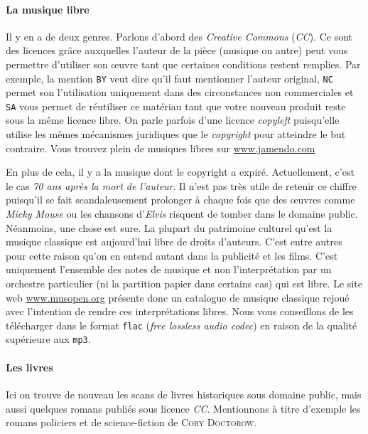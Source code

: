 \documentclass[10pt]{../fiche}
\begin{document}
\paragraph{La musique libre}
Il y en a de deux genres. Parlons d'abord des \textit{Creative Commons} (\textit{CC}). Ce sont des licences grâce auxquelles l'auteur de la pièce (musique ou autre) peut vous permettre
d'utiliser son \oe uvre tant que certaines conditions restent remplies. Par exemple, la mention \texttt{BY} veut dire qu'il faut mentionner l'auteur original, \texttt{NC} permet son l'utilisation
uniquement dans des circonstances non commerciales et \texttt{SA} vous permet de réutiliser ce matériau tant que votre nouveau produit reste sous la même licence libre.
On parle parfois d'une licence \textit{copyleft} puisqu'elle utilise les mêmes mécanismes juridiques que le \textit{copyright} pour atteindre le but contraire. Vous trouvez plein de musiques libres sur \url{www.jamendo.com}

En plus de cela, il y a la musique dont le copyright a expiré. Actuellement, c'est le cas \textit{70 ans après la mort de l'auteur}.
Il n'est pas très utile de retenir ce chiffre puisqu'il se fait scandaleusement prolonger à chaque fois que des \oe uvres comme \textit{Micky Mouse}
ou les chansons d'\textit{Elvis} risquent de tomber dans le domaine public.
Néanmoins, une chose est sure. La plupart du patrimoine culturel qu'est la musique classique est aujourd'hui libre de droits d'auteurs.
C'est entre autres pour cette raison qu'on en entend autant dans la publicité et les films.
C'est uniquement l'ensemble des notes de musique et non l'interprétation par un orchestre particulier (ni la partition papier dans certains cas) qui est libre.
Le site web \url{www.musopen.org} présente donc un catalogue de musique classique rejoué avec l'intention de rendre ces interprétations libres.
Nous vous conseillons de les télécharger dans le format \texttt{flac} (\textit{free lossless audio codec}) en raison de la qualité supérieure aux \texttt{mp3}.

\paragraph{Les livres}
Ici on trouve de nouveau les scans de livres historiques sous domaine public, mais aussi quelques romans publiés sous licence \textit{CC}.
Mentionnons à titre d'exemple les romans policiers et de science-fiction de \textsc{Cory Doctorow}.
\end{document}
